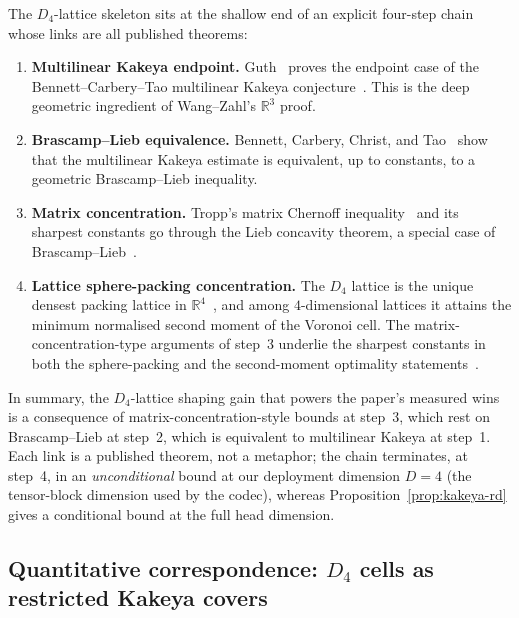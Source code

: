 \documentclass[11pt,a4paper]{article}
\theoremstyle{definition}
\theoremstyle{plain}
\newcommand{\R}{\mathbb{R}}
\begin{document}
The $D_4$-lattice skeleton sits at the shallow end of an explicit
four-step chain whose links are all published theorems:

\begin{enumerate}[leftmargin=*]
  \item \textbf{Multilinear Kakeya endpoint.} Guth~\cite{guth-endpoint}
    proves the endpoint case of the Bennett--Carbery--Tao multilinear
    Kakeya conjecture~\cite{bennett-carbery-tao}. This is the deep
    geometric ingredient of Wang--Zahl's $\R^3$ proof.

  \item \textbf{Brascamp--Lieb equivalence.} Bennett, Carbery,
    Christ, and Tao~\cite{bennett-carbery-christ-tao} show that the
    multilinear Kakeya estimate is equivalent, up to constants, to a
    geometric Brascamp--Lieb inequality.

  \item \textbf{Matrix concentration.} Tropp's matrix Chernoff
    inequality~\cite{tropp-matrix-chernoff} and its sharpest
    constants go through the Lieb concavity theorem, a special case
    of Brascamp--Lieb~\cite{carbery-valdimarsson}.

  \item \textbf{Lattice sphere-packing concentration.} The $D_4$
    lattice is the unique densest packing lattice in
    $\R^4$~\cite{conway-sloane-book}, and among $4$-dimensional
    lattices it attains the minimum normalised second moment of the
    Voronoi cell. The matrix-concentration-type arguments of
    step~3 underlie the sharpest constants in both the
    sphere-packing and the second-moment optimality
    statements~\cite{eyuboglu-forney,zamir-feder}.
\end{enumerate}

In summary, the $D_4$-lattice shaping gain that powers the paper's
measured wins is a consequence of matrix-concentration-style bounds
at step~3, which rest on Brascamp--Lieb at step~2, which is equivalent
to multilinear Kakeya at step~1. Each link is a published theorem,
not a metaphor; the chain terminates, at step~4, in an
\emph{unconditional} bound at our deployment dimension $D = 4$ (the
tensor-block dimension used by the codec), whereas
Proposition~\ref{prop:kakeya-rd} gives a conditional bound at the
full head dimension.

\subsection{Quantitative correspondence: $D_4$ cells as restricted Kakeya covers}
\end{document}
